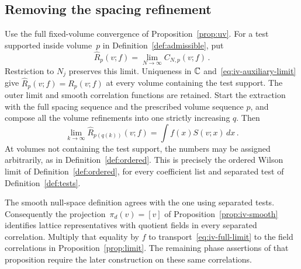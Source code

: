 \subsection{Removing the spacing refinement}\label{subsec:iv-full-spacing}

Use the full fixed-volume convergence of Proposition~\ref{prop:uv}.
For a test supported inside volume~$p$ in Definition~\ref{def:admissible}, put
\begin{equation*}
\widehat R_p(v;f)=\lim_{N\to\infty}C_{N,p}(v;f)\,.
\end{equation*}
Restriction to $N_j$ preserves this limit.
Uniqueness in $\mathbb C$ and~\eqref{eq:iv-auxiliary-limit} give $\widehat R_p(v;f)=R_p(v;f)$ at every volume containing the test support.
The outer limit and smooth correlation functions are retained.
Start the extraction with the full spacing sequence and the prescribed volume sequence $p$, and compose all the volume refinements into one strictly increasing $q$.
Then
\begin{equation}\label{eq:iv-full-limit}
\lim_{k\to\infty}\widehat R_{p(q(k))}(v;f)
=\int f(x)S(v;x)\,dx\,.
\end{equation}
At volumes not containing the test support, the numbers may be assigned arbitrarily, as in Definition~\ref{def:ordered}.
This is precisely the ordered Wilson limit of Definition~\ref{def:ordered}, for every coefficient list and separated test of Definition~\ref{def:tests}.


The smooth null-space definition agrees with the one using separated tests.
Consequently the projection~$\pi_d(v)=[v]$ of Proposition~\ref{prop:iv-smooth} identifies lattice representatives with quotient fields in every separated correlation.
Multiply that equality by $f$ to transport~\eqref{eq:iv-full-limit} to the field correlations in Proposition~\ref{prop:limit}.
The remaining phase assertions of that proposition require the later construction on these same correlations.
